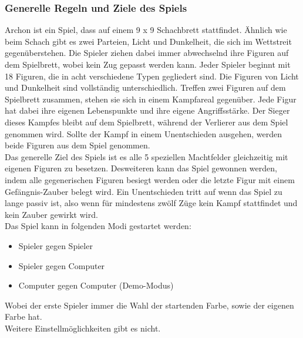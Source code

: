 \subsubsection{Generelle Regeln und Ziele des Spiels}
Archon ist ein Spiel, dass auf einem 9 x 9 Schachbrett stattfindet. Ähnlich wie beim Schach gibt es zwei Parteien, Licht und Dunkelheit, die sich im Wettstreit gegenüberstehen.
Die Spieler ziehen dabei immer abwechselnd ihre Figuren auf dem Spielbrett, wobei kein Zug gepasst werden kann. Jeder Spieler beginnt mit 18 Figuren, die in acht verschiedene Typen gegliedert sind. Die Figuren von Licht und Dunkelheit sind vollständig unterschiedlich. Treffen zwei Figuren auf dem Spielbrett zusammen, stehen sie sich in einem Kampfareal gegenüber. Jede Figur hat dabei ihre eigenen Lebenspunkte und ihre eigene Angriffsstärke. Der Sieger dieses Kampfes bleibt auf dem Spielbrett, während der Verlierer aus dem Spiel genommen wird. Sollte der Kampf in einem Unentschieden ausgehen, werden beide Figuren aus dem Spiel genommen.
\\Das generelle Ziel des Spiels ist es alle 5 speziellen Machtfelder gleichzeitig mit eigenen Figuren zu besetzen.
Desweiteren kann das Spiel gewonnen werden, indem alle gegenerischen Figuren besiegt werden oder die letzte Figur mit einem Gefängnis-Zauber belegt wird.
Ein Unentschieden tritt auf wenn das Spiel zu lange passiv ist, also wenn für mindestens zwölf Züge kein Kampf stattfindet und kein Zauber gewirkt wird.\\
Das Spiel kann in folgenden Modi gestartet werden: 
\begin{itemize}
	\item Spieler gegen Spieler
	\item Spieler gegen Computer
	\item Computer gegen Computer (Demo-Modus)
\end{itemize}
Wobei der erste Spieler immer die Wahl der startenden Farbe, sowie der eigenen Farbe hat.\\Weitere Einstellmöglichkeiten gibt es nicht.


